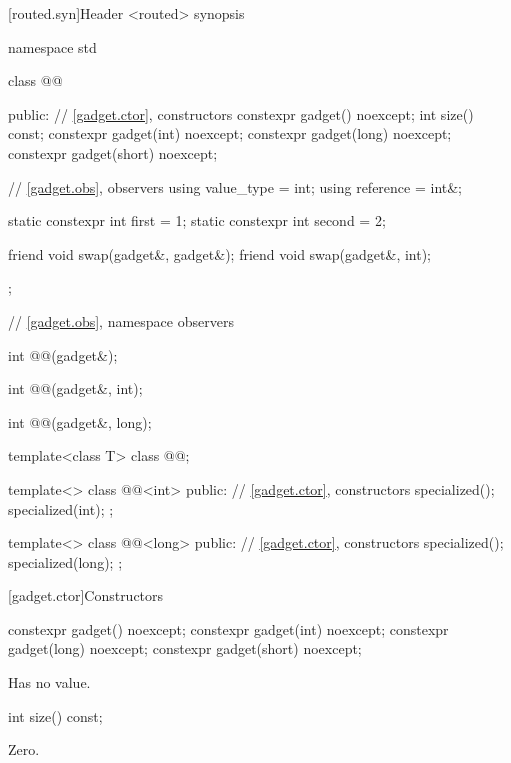 [routed.syn]{Header <routed> synopsis}

\begin{codeblock}
namespace std {
  class @@ {
  public:
    // \ref{gadget.ctor}, constructors
    constexpr gadget() noexcept;
    int size() const;
    constexpr gadget(int) noexcept;
    constexpr gadget(long) noexcept;
    constexpr gadget(short) noexcept;

    // \ref{gadget.obs}, observers
    using value_type = int;
    using reference = int&;

    static constexpr int first = 1;
    static constexpr int second = 2;

    friend void swap(gadget&, gadget&);
    friend void swap(gadget&, int);
  };

  // \ref{gadget.obs}, namespace observers

  int @@(gadget&);

  int @@(gadget&, int);

  int @@(gadget&, long);

  template<class T> class @@;

  template<>
  class @@<int> {
  public:
    // \ref{gadget.ctor}, constructors
    specialized();
    specialized(int);
  };

  template<>
  class @@<long> {
  public:
    // \ref{gadget.ctor}, constructors
    specialized();
    specialized(long);
  };
}
\end{codeblock}

[gadget.ctor]{Constructors}

%
\begin{itemdecl}
constexpr gadget() noexcept;
constexpr gadget(int) noexcept;
constexpr gadget(long) noexcept;
constexpr gadget(short) noexcept;
\end{itemdecl}

\begin{itemdescr}
\pnum
\ensures
Has no value.
\end{itemdescr}

%
\begin{itemdecl}
int size() const;
\end{itemdecl}

\begin{itemdescr}
\pnum
\returns
Zero.
\end{itemdescr}

